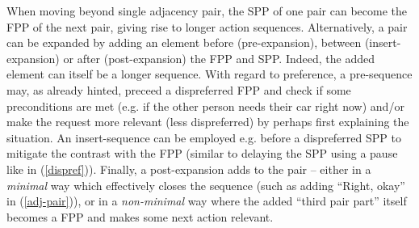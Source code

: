 \documentclass[11pt]{article}
\newcommand{\eref}[1]{(\autoref{#1})}
\begin{document}
{    %
    When moving beyond single adjacency pair, the SPP of one pair can become the FPP of the next pair, giving rise to longer action sequences. 
    Alternatively, a pair can be expanded by adding an element before (pre-expansion), between (insert-expansion) or after (post-expansion) the FPP and SPP. Indeed, the added element can itself be a longer sequence.
    With regard to preference, a pre-sequence may, as already hinted, preceed a dispreferred FPP and check if some preconditions are met (e.g. if the other person needs their car right now) and/or make the request more relevant (less dispreferred) by perhaps first explaining the situation.
    An insert-sequence can be employed e.g. before a dispreferred SPP to mitigate the contrast with the FPP (similar to delaying the SPP using a pause like in \eref{dispref}).
    Finally, a post-expansion adds to the pair -- either in a \textit{minimal} way which effectively closes the sequence (such as adding ``Right, okay'' in \eref{adj-pair}), or in a \textit{non-minimal} way where the added ``third pair part'' itself becomes a FPP and makes some next action relevant.
}
\end{document}
